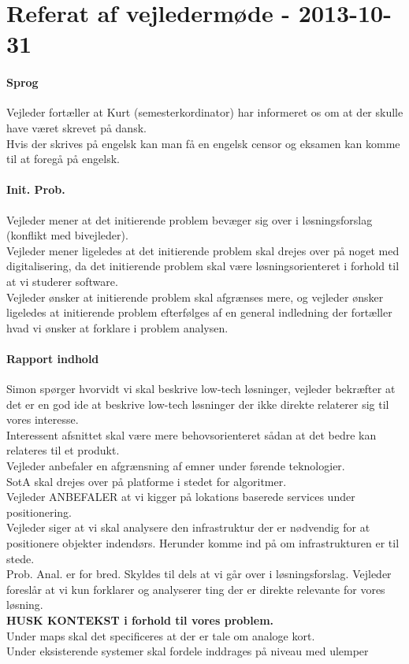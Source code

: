 \documentclass[article,oneside,11pt]{memoir}
\begin{document}
\section{Referat af vejledermøde - 2013-10-31}
\paragraph{Sprog}
Vejleder fortæller at Kurt (semesterkordinator) har informeret os om at der skulle have været skrevet på dansk. \\
Hvis der skrives på engelsk kan man få en engelsk censor og eksamen kan komme til at foregå på engelsk.
\paragraph{Init. Prob.}
Vejleder mener at det initierende problem bevæger sig over i løsningsforslag (konflikt med bivejleder). \\
Vejleder mener ligeledes at det initierende problem skal drejes over på noget med digitalisering, da det initierende problem skal være løsningsorienteret i forhold til at vi studerer software. \\
Vejleder ønsker at initierende problem skal afgrænses mere, og vejleder ønsker ligeledes at initierende problem efterfølges af en general indledning der fortæller hvad vi ønsker at forklare i problem analysen.\\
\paragraph{Rapport indhold}
Simon spørger hvorvidt vi skal beskrive low-tech løsninger, vejleder bekræfter at det er en god ide at beskrive low-tech løsninger der ikke direkte relaterer sig til vores interesse.\\
Interessent afsnittet skal være mere behovsorienteret sådan at det bedre kan relateres til et produkt.\\
Vejleder anbefaler en afgrænsning af emner under førende teknologier.\\
SotA skal drejes over på platforme i stedet for algoritmer.\\
Vejleder ANBEFALER at vi kigger på lokations baserede services under positionering.\\
Vejleder siger at vi skal analysere den infrastruktur der er nødvendig for at positionere objekter indendørs. Herunder komme ind på om infrastrukturen er til stede.\\
Prob. Anal. er for bred. Skyldes til dels at vi går over i løsningsforslag. Vejleder foreslår at vi kun forklarer og analyserer ting der er direkte relevante for vores løsning.\\
\textbf{HUSK KONTEKST i forhold til vores problem.}\\
Under maps skal det specificeres at der er tale om analoge kort.\\
Under eksisterende systemer skal fordele inddrages på niveau med ulemper\\
\end{document}
